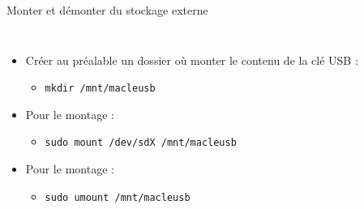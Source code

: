 \documentclass[aspectratio=169,xcolor=dvipsnames]{beamer}
\begin{document}
\begin{frame}{Monter et démonter du stockage externe}
    \begin{columns}[c] %

        \begin{itemize}
            \item Créer au préalable un dossier où monter le contenu de la clé USB :
            \begin{itemize}
                \item \texttt{mkdir /mnt/macleusb}
            \end{itemize}
            \item Pour le montage :
            \begin{itemize}
                \item \texttt{sudo mount /dev/sdX /mnt/macleusb}
            \end{itemize}
            \item Pour le montage :
            \begin{itemize}
                \item \texttt{sudo umount /mnt/macleusb}
            \end{itemize}
        \end{itemize}

    \end{columns}
\end{frame}
\end{document}
